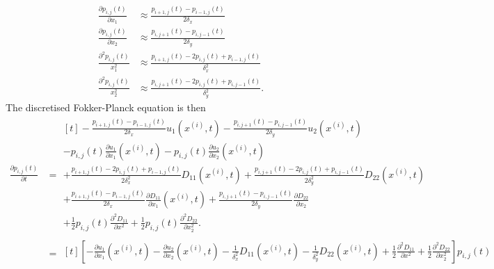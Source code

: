 $$
	\begin{aligned}
		\frac{\partial p_{i,j}(t)}{\partial x_1} & \approx \frac{p_{i+1, j}(t) - p_{i-1,j}(t)}{2\delta_x}                \\
		\frac{\partial p_{i,j}(t)}{\partial x_2} & \approx \frac{p_{i,j+1}(t) - p_{i,j-1}(t)}{2\delta_y}                 \\
		\frac{\partial^2 p_{i,j}(t)}{x_1^2}      & \approx \frac{p_{i+1,j}(t) - 2p_{i,j}(t) + p_{i-1,j}(t)}{\delta_x^2}  \\
		\frac{\partial^2 p_{i,j}(t)}{x_2^2}      & \approx \frac{p_{i,j+1}(t) - 2p_{i,j}(t) + p_{i,j-1}(t)}{\delta_y^2}.
	\end{aligned}
$$
The discretised Fokker-Planck equation is then
\begin{align*}
	\frac{\partial p_{i,j}(t)}{\partial t} & = \begin{multlined}[t]
		                                           - \frac{p_{i+1, j}(t) - p_{i-1,j}(t)}{2\delta_x} u_1(x^{(i)}, t) - \frac{p_{i,j+1}(t) - p_{i,j-1}(t)}{2\delta_y} u_2(x^{(i)}, t) \\  - p_{i,j}(t)\frac{\partial u_1}{\partial x_1}(x^{(i)},t) - p_{i,j}(t)\frac{\partial u_2}{\partial x_2}(x^{(i)}, t) \\
		                                           + \frac{p_{i+1,j}(t) - 2p_{i,j}(t) + p_{i-1,j}(t)}{2\delta_x^2}D_{11}\left(x^{(i)}, t\right)
		                                           + \frac{p_{i,j+1}(t) - 2p_{i,j}(t) + p_{i,j-1}(t)}{2\delta_y^2}D_{22}\left(x^{(i)}, t\right) \\
		                                           + \frac{p_{i+1, j}(t) - p_{i-1,j}(t)}{2\delta_x}\frac{\partial D_{11}}{\partial x_1}\left(x^{(i)}, t\right)
		                                           + \frac{p_{i,j+1}(t) - p_{i,j-1}(t)}{2\delta_y}\frac{\partial D_{22}}{\partial x_2} \\
		                                           + \frac12p_{i,j}(t)\frac{\partial^2 D_{11}}{\partial x^2} + \frac12p_{i,j}(t)\frac{\partial^2 D_{22}}{\partial x_2^2}.
	                                           \end{multlined}                                                                                                           \\
	                                       & = \begin{multlined}[t]\left[-\frac{\partial u_1}{\partial x_1}(x^{(i)},t) - \frac{\partial u_2}{\partial x_2}(x^{(i)},t) - \frac{1}{\delta_x^2}D_{11}\left(x^{(i)}, t\right) - \frac{1}{\delta_y^2}D_{22}\left(x^{(i)}, t\right) + \frac{1}{2}\frac{\partial^2 D_{11}}{\partial x^2} + \frac12\frac{\partial^2 D_{22}}{\partial x_2^2} \right]p_{i,j}(t) \\

\end{multlined}
\end{align*}
